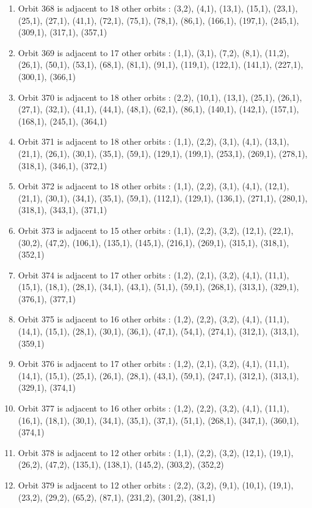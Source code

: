 \documentclass[12pt]{article}
\begin{document}
\begin{enumerate}
\item Orbit 368 is adjacent to 18 other orbits : (3,2), (4,1), (13,1), (15,1), (23,1), (25,1), (27,1), (41,1), (72,1), (75,1), (78,1), (86,1), (166,1), (197,1), (245,1), (309,1), (317,1), (357,1)
\item Orbit 369 is adjacent to 17 other orbits : (1,1), (3,1), (7,2), (8,1), (11,2), (26,1), (50,1), (53,1), (68,1), (81,1), (91,1), (119,1), (122,1), (141,1), (227,1), (300,1), (366,1)
\item Orbit 370 is adjacent to 18 other orbits : (2,2), (10,1), (13,1), (25,1), (26,1), (27,1), (32,1), (41,1), (44,1), (48,1), (62,1), (86,1), (140,1), (142,1), (157,1), (168,1), (245,1), (364,1)
\item Orbit 371 is adjacent to 18 other orbits : (1,1), (2,2), (3,1), (4,1), (13,1), (21,1), (26,1), (30,1), (35,1), (59,1), (129,1), (199,1), (253,1), (269,1), (278,1), (318,1), (346,1), (372,1)
\item Orbit 372 is adjacent to 18 other orbits : (1,1), (2,2), (3,1), (4,1), (12,1), (21,1), (30,1), (34,1), (35,1), (59,1), (112,1), (129,1), (136,1), (271,1), (280,1), (318,1), (343,1), (371,1)
\item Orbit 373 is adjacent to 15 other orbits : (1,1), (2,2), (3,2), (12,1), (22,1), (30,2), (47,2), (106,1), (135,1), (145,1), (216,1), (269,1), (315,1), (318,1), (352,1)
\item Orbit 374 is adjacent to 17 other orbits : (1,2), (2,1), (3,2), (4,1), (11,1), (15,1), (18,1), (28,1), (34,1), (43,1), (51,1), (59,1), (268,1), (313,1), (329,1), (376,1), (377,1)
\item Orbit 375 is adjacent to 16 other orbits : (1,2), (2,2), (3,2), (4,1), (11,1), (14,1), (15,1), (28,1), (30,1), (36,1), (47,1), (54,1), (274,1), (312,1), (313,1), (359,1)
\item Orbit 376 is adjacent to 17 other orbits : (1,2), (2,1), (3,2), (4,1), (11,1), (14,1), (15,1), (25,1), (26,1), (28,1), (43,1), (59,1), (247,1), (312,1), (313,1), (329,1), (374,1)
\item Orbit 377 is adjacent to 16 other orbits : (1,2), (2,2), (3,2), (4,1), (11,1), (16,1), (18,1), (30,1), (34,1), (35,1), (37,1), (51,1), (268,1), (347,1), (360,1), (374,1)
\item Orbit 378 is adjacent to 12 other orbits : (1,1), (2,2), (3,2), (12,1), (19,1), (26,2), (47,2), (135,1), (138,1), (145,2), (303,2), (352,2)
\item Orbit 379 is adjacent to 12 other orbits : (2,2), (3,2), (9,1), (10,1), (19,1), (23,2), (29,2), (65,2), (87,1), (231,2), (301,2), (381,1)

\end{enumerate}
\end{document}
